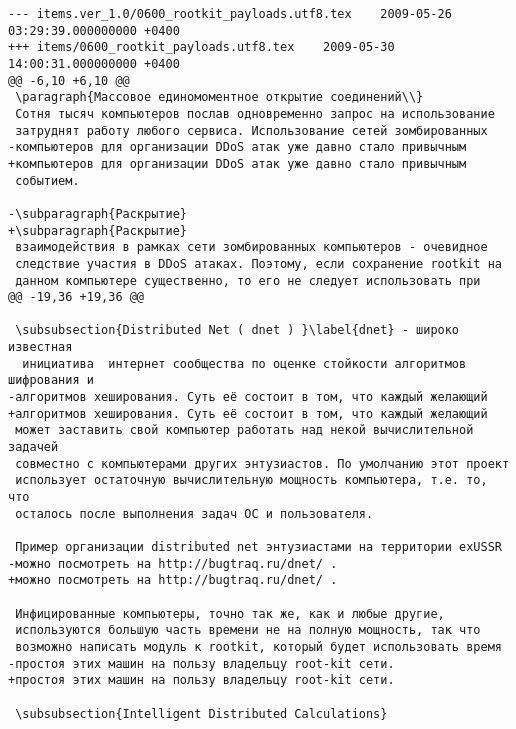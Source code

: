 \begin{verbatim}
--- items.ver_1.0/0600_rootkit_payloads.utf8.tex	2009-05-26 03:29:39.000000000 +0400
+++ items/0600_rootkit_payloads.utf8.tex	2009-05-30 14:00:31.000000000 +0400
@@ -6,10 +6,10 @@
 \paragraph{Массовое единомоментное открытие соединений\\}
 Сотня тысяч компьютеров послав одновременно запрос на использование
 затруднят работу любого сервиса. Использование сетей зомбированных
-компьютеров для организации DDoS атак уже давно стало привычным
+компьютеров для организации DDoS атак уже давно стало привычным
 событием.

-\subparagraph{Раскрытие}
+\subparagraph{Раскрытие}
 взаимодействия в рамках сети зомбированных компьютеров - очевидное
 следствие участия в DDoS атаках. Поэтому, если сохранение rootkit на
 данном компьютере существенно, то его не следует использовать при
@@ -19,36 +19,36 @@

 \subsubsection{Distributed Net ( dnet ) }\label{dnet} - широко известная
  инициатива  интернет сообщества по оценке стойкости алгоритмов шифрования и
-алгоритмов хеширования. Суть её состоит в том, что каждый желающий
+алгоритмов хеширования. Суть её состоит в том, что каждый желающий
 может заставить свой компьютер работать над некой вычислительной задачей
 совместно с компьютерами других энтузиастов. По умолчанию этот проект
 использует остаточную вычислительную мощность компьютера, т.е. то, что
 осталось после выполнения задач ОС и пользователя.

 Пример организации distributed net энтузиастами на территории exUSSR
-можно посмотреть на http://bugtraq.ru/dnet/ .
+можно посмотреть на http://bugtraq.ru/dnet/ .

 Инфицированные компьютеры, точно так же, как и любые другие,
 используются большую часть времени не на полную мощность, так что
 возможно написать модуль к rootkit, который будет использовать время
-простоя этих машин на пользу владельцу root-kit сети.
+простоя этих машин на пользу владельцу root-kit сети.

 \subsubsection{Intelligent Distributed Calculations}


\end{verbatim}
